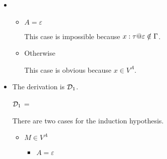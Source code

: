 \begin{itemize}
	\item \TVar
	      \begin{itemize}
	      	\item $ A = \varepsilon$
	      	      	      	      	      	      	      	      	      	      	      	      	      	      	      	      	      	      	      	      		      	      	      	      	      	      	      	      
	      	      This case is impossible because $x:\tau@\varepsilon \notin \G$.
	      	\item Otherwise
	      	      	      	      	      	      	      	      	      	      	      	      	      	      	      	      	      	      	      	      		      	      	      	      	      	      	      	      
	      	      This case is obvious because $x \in V^A$.
	      \end{itemize}
	      	      	      	      	      	      	      	      	      	      		      	      	      	      
	\item \TTBL
	      	      	      	      	      	      	      	      	      	      		      	      	      	      
	      The derivation is $\mathcal{D}_1$.
	      	      	      	      	      	      	      	      	      	      		      	      	      	      
	      $\mathcal{D}_1$ = 
	      {}
	      	      	      	      	      	      	      	      	      	      		      	      	      	      
	      There are two cases for the induction hypothesis.
	      	      	      	      	      	      	      	      	      	      		      	      	      	      
	      \begin{itemize}
	      		      		      		      		      		      		      		      		      		      			      		      		      		      	
	      	\item $ M \in V^A $
	      	      	      	      	      	      	      	      	      	      	      	      	      	      	      	      	      	      	      	      		      	      	      	      	      	      	      	      
	      	      \begin{itemize}
	      	      	\item $ A = \varepsilon $
	      	      	      	      	      	      	      	      	      	      	      	      	      	      	      	      	      	      	      	      	      	      	      	      	      	      	      	      	      	      		      	      	      	      	      	      	      	      	      	      	      	      

\end{itemize}
\end{itemize}
\end{itemize}
